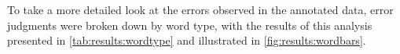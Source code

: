 			
			To take a more detailed look at the errors observed in the annotated data, error judgments were broken down by word type, with the results of this analysis presented in \cref{tab:results:wordtype} and illustrated in \cref{fig:results:wordbars}. 
			
			
			
			
